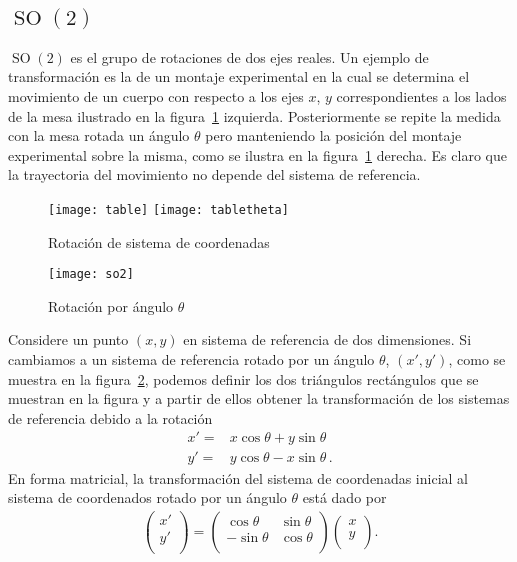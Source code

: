 \subsection{$\operatorname{SO}(2)$}



$\operatorname{SO}(2)$ es el grupo de rotaciones de dos ejes reales. Un ejemplo de transformación es la de un montaje experimental en la cual se determina el movimiento de un cuerpo con respecto a los ejes $x$, $y$ correspondientes a los lados de la mesa ilustrado en la figura~\ref{fig:tabla} izquierda. Posteriormente se repite la medida con la mesa rotada un ángulo $\theta$ pero manteniendo la posición del montaje experimental sobre la misma, como se ilustra en la figura~\ref{fig:tabla} derecha. Es claro que la trayectoria del movimiento no depende del sistema de referencia.
\begin{figure}
  \centering
  \texttt{[image: table]}
  \texttt{[image: tabletheta]}
  \caption{Rotación de sistema de coordenadas}
  \label{fig:tabla}
\end{figure}




\begin{figure}
  \centering
  \texttt{[image: so2]}
  \caption{Rotación por ángulo $\theta$}
  \label{fig:so2}
\end{figure}



Considere un punto $(x,y)$ en sistema de referencia de dos dimensiones. Si cambiamos a un sistema de referencia rotado por un ángulo $\theta$, $(x',y')$, como se muestra en la figura~\ref{fig:so2}, podemos definir los dos triángulos rectángulos que se muestran en la figura y a partir de ellos obtener la transformación de los sistemas de referencia debido a la rotación
\begin{align}
  x'=&x\cos\theta+y\sin\theta \nonumber\\
  y'=&y\cos\theta-x\sin\theta\,.
\end{align}
En forma matricial, la transformación del sistema de coordenadas inicial al sistema de coordenados rotado por un ángulo $\theta$ está dado por
\begin{align}
  \begin{pmatrix}
    x'\\
    y'\\
  \end{pmatrix}=
  \begin{pmatrix}
    \cos\theta & \sin\theta\\
    -\sin\theta& \cos\theta\\
  \end{pmatrix}
  \begin{pmatrix}
    x\\
    y\\
  \end{pmatrix}.
\end{align}

